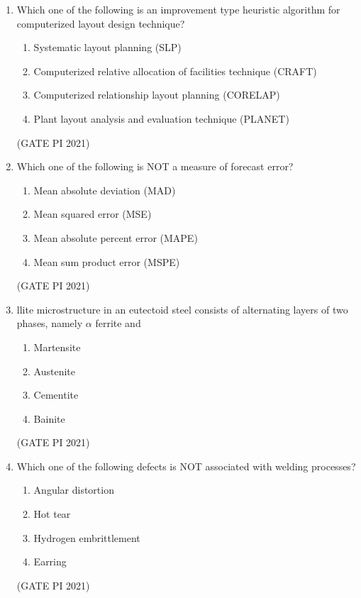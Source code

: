 \documentclass[journal,12pt,onecolumn]{IEEEtran}
\theoremstyle{remark}
\begin{document}
\begin{enumerate}
\item
Which one of the following is an improvement type heuristic algorithm for computerized layout design technique?

\begin{enumerate}
\item Systematic layout planning (SLP)
\item Computerized relative allocation of facilities technique (CRAFT)
\item Computerized relationship layout planning (CORELAP)
\item Plant layout analysis and evaluation technique (PLANET)
\end{enumerate}

\hfill (GATE PI 2021)

\item
Which one of the following is NOT a measure of forecast error?

\begin{enumerate}
\item Mean absolute deviation (MAD)
\item Mean squared error (MSE)
\item Mean absolute percent error (MAPE)
\item Mean sum product error (MSPE)
\end{enumerate}
\hfill (GATE PI 2021)

\item
llite microstructure in an eutectoid steel consists of alternating layers of two phases, namely $\alpha$ ferrite and
\begin{multicols}{4}
\begin{enumerate}
\item Martensite
\item Austenite
\item Cementite
\item Bainite
\end{enumerate}
\end{multicols}
\hfill (GATE PI 2021)

\item
Which one of the following defects is NOT associated with welding processes?
\begin{multicols}{2}
\begin{enumerate}
\item Angular distortion
\item Hot tear
\item Hydrogen embrittlement
\item Earring
\end{enumerate}
\end{multicols}
\hfill (GATE PI 2021)


\end{enumerate}
\end{document}
